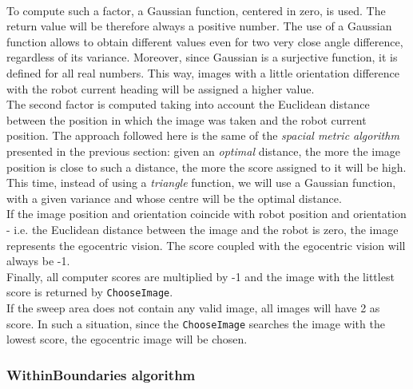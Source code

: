 \\
To compute such a factor, a Gaussian function, centered
in zero, is used. The return value will be therefore 
always a positive number.
The use of a Gaussian function allows to obtain different 
values even for two very close angle difference, 
regardless of its variance. 
Moreover, since Gaussian is a surjective function, 
it is defined for all real numbers.
This way, images with a little orientation difference with 
the robot current heading will be assigned a higher value.
\\
The second factor is computed taking into account the Euclidean 
distance between the position in which the image was taken 
and the robot current position. 
The approach followed here is the same of the \textit{spacial 
metric algorithm} presented in the previous section: 
given an \textit{optimal} distance, the more the image position 
is close to such a distance, the more the score assigned 
to it will be high.
This time, instead of using a \textit{triangle} function, 
we will use a Gaussian function, with a given variance and 
whose centre will be the optimal distance.
\\
If the image position and orientation coincide with robot position 
and orientation - i.e. the Euclidean distance between the image and 
the robot is zero, the image represents the egocentric vision. 
The score coupled with the egocentric vision will 
always be -1.
\\
Finally, all computer scores are multiplied by -1 and 
the image with the littlest score is returned by \texttt{ChooseImage}.
\\
If the sweep area does not contain any valid image, all images will
have 2 as score. In such a situation, since the \texttt{ChooseImage} 
searches the image with the lowest score, the egocentric image 
will be chosen.

\subsubsection{WithinBoundaries algorithm}
\label{concr:iimageselector:spacial_metric_algorithm:withinboundaries}

